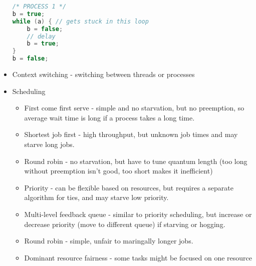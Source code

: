 \documentclass[10pt]{article}
\begin{document}
\begin{itemize}
\begin{lstlisting}[language=c]
/* PROCESS 1 */
b = true;
while (a) { // gets stuck in this loop
    b = false;
    // delay
    b = true;
}
b = false;
\end{lstlisting}
    \item Context switching - switching between threads or processes
    \item Scheduling
    \begin{itemize}
        \item First come first serve - simple and no starvation, but no preemption, so average wait time is long if a process takes a long time.
        \item Shortest job first - high throughput, but unknown job times and may starve long jobs.
        \item Round robin - no starvation, but have to tune quantum length (too long without preemption isn't good, too short makes it inefficient)
        \item Priority - can be flexible based on resources, but requires a separate algorithm for ties, and may starve low priority.
        \item Multi-level feedback queue - similar to priority scheduling, but increase or decrease priority (move to different queue) if starving or hogging.
        \item Round robin - simple, unfair to maringally longer jobs.
        \item Dominant resource fairness - some tasks might be focused on one resource
    \end{itemize}
\end{itemize}
\end{document}
